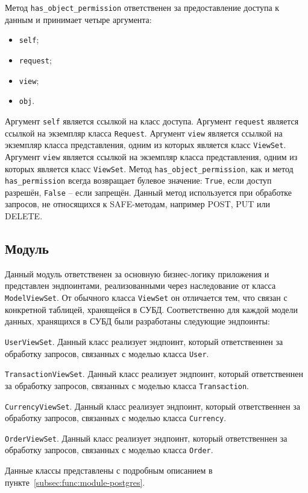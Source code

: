 Метод \lstinline{has_object_permission} ответственен за предоставление доступа к данным и принимает четыре аргумента:
\begin{itemize}
    \item \lstinline{self};
    \item \lstinline{request};
    \item \lstinline{view};
    \item \lstinline{obj}.
\end{itemize}
Аргумент \lstinline{self} является ссылкой на класс доступа.
Аргумент \lstinline{request} является ссылкой на экземпляр класса \lstinline{Request}.
Аргумент \lstinline{view} является ссылкой на экземпляр класса представления, одним из которых является класс \lstinline{ViewSet}.
Аргумент \lstinline{view} является ссылкой на экземпляр класса представления, одним из которых является класс \lstinline{ViewSet}.
Метод \lstinline{has_object_permission}, как и метод \lstinline{has_permission} всегда возвращает булевое значение: \lstinline{True}, если доступ разрешён, \lstinline{False} -- если запрещён.
Данный метод используется при обработке запросов, не относящихся к SAFE-методам, например POST, PUT или DELETE.

%

\subsection{Модуль \moduleTrading}\label{subsec:func:module-trading}
Данный модуль ответственен за основную бизнес-логику приложения и представлен эндпоинтами,
реализованными через наследование от класса \lstinline{ModelViewSet}.
От обычного класса \lstinline{ViewSet} он отличается тем, что связан с конкретной таблицей, хранящейся в СУБД.
Соответственно для каждой модели данных, хранящихся в СУБД были разработаны следующие эндпоинты:
\begin{enumerate_num}
    \item \lstinline{UserViewSet}.
    Данный класс реализует эндпоинт, который ответственнен за обработку запросов, связанных с моделью класса \lstinline{User}.
    \item \lstinline{TransactionViewSet}.
    Данный класс реализует эндпоинт, который ответственнен за обработку запросов, связанных с моделью класса \lstinline{Transaction}.
    \item \lstinline{CurrencyViewSet}.
    Данный класс реализует эндпоинт, который ответственнен за обработку запросов, связанных с моделью класса \lstinline{Currency}.
    \item \lstinline{OrderViewSet}.
    Данный класс реализует эндпоинт, который ответственнен за обработку запросов, связанных с моделью класса \lstinline{Order}.
\end{enumerate_num}
Данные классы представлены с подробным описанием в пункте~\ref{subsec:func:module-postgres}.

